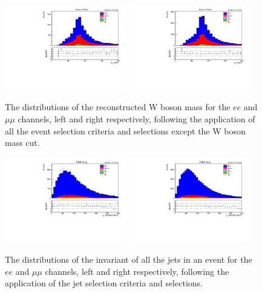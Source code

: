 \begin{figure}[tbp]
\centering
\includegraphics[width=0.47\textwidth]{figs/background-estimation/plots/unblinded/prompt_ee_ttbarInc/wMass_bTag.pdf}
\includegraphics[width=0.47\textwidth]{figs/background-estimation/plots/unblinded/prompt_mumu_ttbarInc/wMass_bTag.pdf}
\caption{
The distributions of the reconstructed W boson mass for the $ee$ and $\mu\mu$ channels, left and right respectively, following the application of all the event selection criteria and selections except the W boson mass cut.
}
\label{fig:SR_wBoson}
\end{figure}

\begin{figure}[tbp]
\centering
\includegraphics[width=0.47\textwidth]{figs/background-estimation/plots/unblinded/prompt_ee_ttbarInc/totalJetPt_jetSel.pdf}
\includegraphics[width=0.47\textwidth]{figs/background-estimation/plots/unblinded/prompt_mumu_ttbarInc/totalJetPt_jetSel.pdf}
\caption{
The distributions of the invariant \pT of all the jets in an event for the $ee$ and $\mu\mu$ channels, left and right respectively, following the application of the jet selection criteria and selections.
}
\label{fig:SR_totJetPt}
\end{figure}

